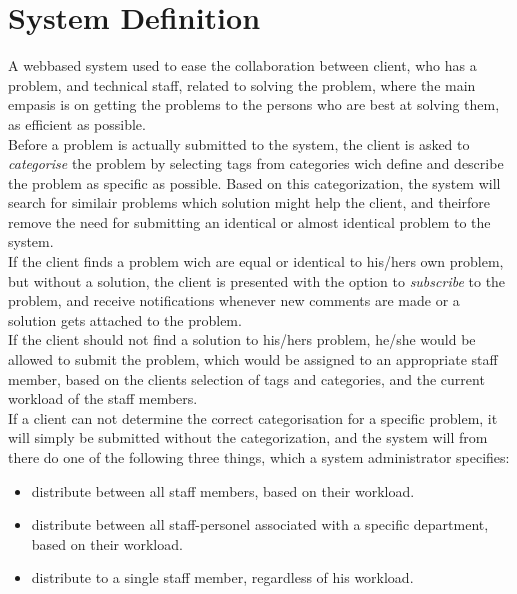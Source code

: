 \section{System Definition}
\label{sec:systemdefinition}


A webbased system used to ease the collaboration between client, who has a problem, and technical staff, related to solving the problem, where the main empasis is on getting the problems to the persons who are best at solving them, as efficient as possible. \\


Before a problem is actually submitted to the system, the client is asked to \textit{categorise} the problem by selecting tags from categories wich define and describe the problem as specific as possible. Based on this categorization, the system will search for similair problems which solution might help the client, and theirfore remove the need for submitting an identical or almost identical problem to the system.\\

If the client finds a problem wich are equal or identical to his/hers own problem, but without a solution, the client is presented with the option to \textit{subscribe} to the problem, and receive notifications whenever new comments are made or a solution gets attached to the problem. \\

If the client should not find a solution to his/hers problem, he/she would be allowed to submit the problem, which would be assigned to an appropriate staff member, based on the clients selection of tags and categories, and the current workload of the staff members. \\

If a client can not determine the correct categorisation for a specific problem, it will simply be submitted without the categorization, and the system will from there do one of the following three things, which a system administrator specifies:

\begin{itemize}
	\item distribute between all staff members, based on their workload.
	\item distribute between all staff-personel associated with a specific department, based on their workload.
	\item distribute to a single staff member, regardless of his workload.
\end{itemize}

